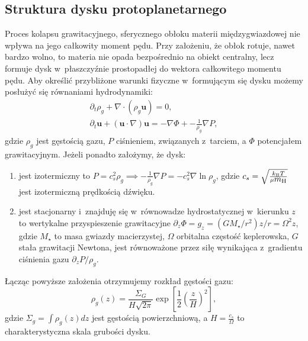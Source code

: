\subsection{Struktura dysku protoplanetarnego}
Proces kolapsu grawitacyjnego, sferycznego obłoku materii międzygwiazdowej nie
wpływa na jego całkowity moment pędu. Przy założeniu, że obłok rotuje, nawet
bardzo wolno, to materia nie opada bezpośrednio na obiekt
centralny, lecz formuje dysk w~płaszczyźnie prostopadłej do wektora całkowitego
momentu pędu. Aby określić przybliżone warunki fizyczne w~formującym się dysku
możemy posłużyć się równaniami hydrodynamiki:
%
\begin{gather}
   \partial_t \rho_g + \nabla\cdot\left(\rho_g\mathbf{u}\right) = 0,
   \label{eq:hd1}\\
\partial_t \mathbf{u} + \left(\mathbf{u}\cdot\nabla\right)\mathbf{u} = 
-\nabla\Phi + -\frac{1}{\rho_g} \nabla P, \label{eq:hd2}
\end{gather}
%
gdzie $\rho_g$ jest gęstością gazu, $P$ ciśnieniem, 
związanych z~tarciem, a $\Phi$ potencjałem grawitacyjnym. Jeżeli ponadto
założymy, że dysk:
%
\begin{enumerate}
   \item jest izotermiczny to $P = c_s^2 \rho_g \implies -\frac{1}{\rho_g}\nabla
      P = -c_s^2\nabla\ln\rho_g$, gdzie $c_s = \sqrt{\frac{k_{\textrm{B}} T}{\mu
    \hbox{$m_{\textrm{H}}$}}}$ jest izotermiczną prędkością dźwięku.
   \item jest stacjonarny i~znajduję się w~równowadze hydrostatycznej w~kierunku
      $z$ to wertykalne przyspieszenie grawitacyjne $\partial_z \Phi = g_z =
      (GM_\star/r^2) z/r = \Omega^2 z$, gdzie $M_\star$ to masa gwiazdy
      macierzystej, $\Omega$ orbitalna częstość keplerowska, $G$ stała
      grawitacji Newtona, jest równoważone przez siłę wynikająca z~gradientu
      ciśnienia gazu $\partial_z P / \rho_g$.
\end{enumerate}
%
Łącząc powyższe założenia otrzymujemy rozkład gęstości gazu:
%
\begin{equation} \label{eq:zeq}
   \rho_g(z) = \frac{\Sigma_G}{H\sqrt{2\pi}} \exp \left[
   \frac{1}{2}\left(\frac{z}{H}\right)^2 \right],
\end{equation}
%
gdzie $\Sigma_g = \int \rho_g(z) dz$ jest gęstością powierzchniową, a
$H=\frac{c_s}{\Omega}$ to charakterystyczna skala grubości dysku.
%
